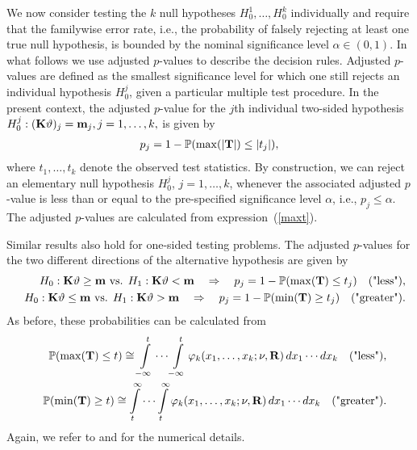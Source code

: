 \documentclass[12pt]{article}
\begin{document}
We now consider testing the $k$ null hypotheses $H_0^1, \ldots, H_0^k$ individually and
require that the familywise error rate, i.e., the probability
of falsely rejecting at least one true null hypothesis, is bounded by
the nominal significance level $\alpha \in (0, 1)$. In what follows
we use adjusted $p$-values to describe the decision rules.
Adjusted $p$-values are defined as the
smallest significance level for which one still rejects an
individual hypothesis $H_0^j$, given a particular multiple
test procedure. In the present context, the adjusted
$p$-value for the $j$th individual two-sided hypothesis
$
H_0^j: (\mathbf{K} \vartheta)_j = \mathbf{m}_j, j = 1, \dots, k,
$
is given by
\begin{eqnarray*}
p_j = 1 - \mathbb{P}(\max(|\mathbf{T}|) \le |t_j|),
\end{eqnarray*}
where $t_1, \dots, t_k$ denote the observed test statistics.
By construction, we can reject an elementary null hypothesis $H_0^j$, $j= 1, \ldots, k$,
whenever the associated adjusted $p$-value is less than or equal to the pre-specified significance
level $\alpha$, i.e., $p_j \leq \alpha$. The adjusted $p$-values are calculated
from expression~(\ref{maxt}).

Similar results also hold for one-sided testing problems. The adjusted $p$-values for the two different
directions of the alternative hypothesis are given by
\begin{eqnarray*}
& & H_0: \mathbf{K} \vartheta \ge \mathbf{m} \text{ vs. } H_1: \mathbf{K} \vartheta < \mathbf{m}  \quad \Rightarrow \quad p_j  =  1 - \mathbb{P}(\max(\mathbf{T}) \le
t_j) \quad \text{("less")}, \\
& & H_0: \mathbf{K} \vartheta \le \mathbf{m} \text{ vs. } H_1: \mathbf{K} \vartheta > \mathbf{m} \quad \Rightarrow \quad p_j  =  1 - \mathbb{P}(\min(\mathbf{T}) \ge
t_j) \quad \text{("greater")}.
\end{eqnarray*}
As before, these probabilities can be calculated from
\begin{eqnarray*}
& & \mathbb{P}(\max(\mathbf{T}) \le t)  \cong\int\limits_{-\infty}^t \cdots \int\limits_{-\infty}^t
\varphi_k(x_1, \dots, x_k; \nu, \mathbf{R}) \, dx_1 \cdots dx_k \quad \text{("less")},\\
& & \mathbb{P}(\min(\mathbf{T}) \ge t) \cong  \int\limits_{t}^\infty \cdots \int\limits_{t}^\infty \varphi_k(x_1, \dots, x_k;
\nu, \mathbf{R}) \, dx_1 \cdots dx_k \quad
\text{("greater")}.
\end{eqnarray*}
Again, we refer to \cite{Genz1992,GenzBretz1999,BretzGenzHothorn2001}
and \cite{GenzBretz2002} for the numerical details.

\end{document}
